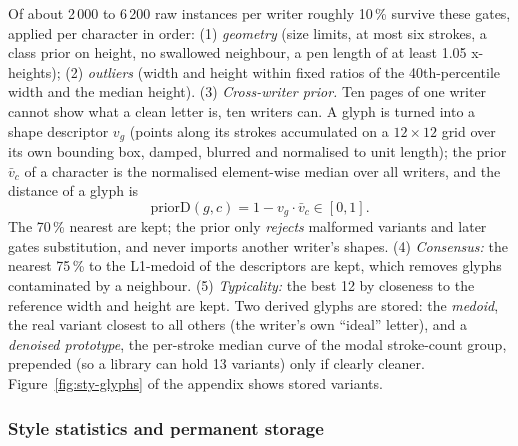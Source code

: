 Of about 2\,000 to 6\,200 raw instances per writer roughly 10\,\% survive these gates, applied per character in order: (1) \emph{geometry} (size limits, at most six strokes, a class prior on height, no swallowed neighbour, a pen length of at least 1.05 x-heights); (2) \emph{outliers} (width and height within fixed ratios of the 40th-percentile width and the median height).
(3) \emph{Cross-writer prior.} Ten pages of one writer cannot show what a clean letter is, ten writers can. A glyph is turned into a shape descriptor $v_g$ (points along its strokes accumulated on a $12\times12$ grid over its own bounding box, damped, blurred and normalised to unit length); the prior $\bar v_c$ of a character is the normalised element-wise median over all writers, and the distance of a glyph is
\begin{equation}
\mathrm{priorD}(g,c)=1-v_g\cdot\bar v_c\in[0,1].
\label{eq:sty-prior}
\end{equation}
The 70\,\% nearest are kept; the prior only \emph{rejects} malformed variants and later gates substitution, and never imports another writer's shapes.
(4) \emph{Consensus:} the nearest 75\,\% to the L1-medoid of the descriptors are kept, which removes glyphs contaminated by a neighbour. (5) \emph{Typicality:} the best 12 by closeness to the reference width and height are kept.
Two derived glyphs are stored: the \emph{medoid}, the real variant closest to all others (the writer's own ``ideal'' letter), and a \emph{denoised prototype}, the per-stroke median curve of the modal stroke-count group, prepended (so a library can hold 13 variants) only if clearly cleaner.
Figure~\ref{fig:sty-glyphs} of the appendix shows stored variants.

\subsubsection{Style statistics and permanent storage}

